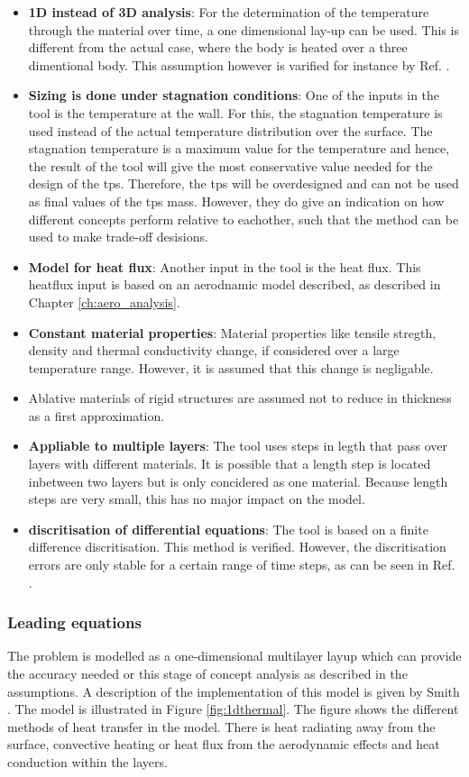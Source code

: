 \begin{itemize}
\item \textbf{1D instead of 3D analysis}: For the determination of the temperature through the material over time, a one dimensional lay-up can be used. This is different from the actual case, where the body is heated over a three dimentional body. This assumption however is varified for instance by Ref. \cite{Corso2009}.
\item \textbf{Sizing is done under stagnation conditions}: One of the inputs in the tool is the temperature at the wall. For this, the stagnation temperature is used instead of the actual temperature distribution over the surface. The stagnation temperature is a maximum value for the temperature and hence, the result of the tool will give the most conservative value needed for the design of the \gls{tps}. Therefore, the \gls{tps} will be overdesigned and can not be used as final values of the \gls{tps} mass. However, they do give an indication on how different concepts perform relative to eachother, such that the method can be used to make trade-off desisions.
\item \textbf{Model for heat flux}: Another input in the tool is the heat flux. This heatflux input is based on an aerodnamic model described, as described in Chapter \ref{ch:aero_analysis}.
\item \textbf{Constant material properties}: Material properties like tensile stregth, density and thermal conductivity change, if considered over a large temperature range. However, it is assumed that this change is negligable. 
\item Ablative materials of rigid structures are assumed not to reduce in thickness as a first approximation.
\item \textbf{Appliable to multiple layers}: The tool uses steps in legth that pass over layers with different materials. It is possible that a length step is located inbetween two layers but is only concidered as one material. Because length steps are very small, this has no major impact on the model.
\item \textbf{discritisation of differential equations}: The tool is based on a finite difference discritisation. This method is verified. However, the discritisation errors are only stable for a certain range of time steps, as can be seen in Ref. \cite{Smith2011}. 
\end{itemize}

\subsubsection{Leading equations}
The problem is modelled as a one-dimensional multilayer layup which can provide the accuracy needed or this stage of concept analysis as described in the assumptions. A description of the implementation of this model is given by Smith \cite{Smith2011}. The model is illustrated in Figure \ref{fig:1dthermal}. The figure shows the different methods of heat transfer in the model. There is heat radiating away from the surface, convective heating or heat flux from the aerodynamic effects and heat conduction within the layers.

